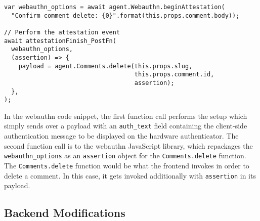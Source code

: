 \begin{lstlisting}
var webauthn_options = await agent.Webauthn.beginAttestation(
  "Confirm comment delete: {0}".format(this.props.comment.body));

// Perform the attestation event
await attestationFinish_PostFn(
  webauthn_options, 
  (assertion) => {
    payload = agent.Comments.delete(this.props.slug, 
                                    this.props.comment.id,
                                    assertion);
  },
);
\end{lstlisting}

In the webauthn code snippet, the first function call performs the setup which simply sends over a payload with an \lstinline{auth_text} field containing the client-side authentication message to be displayed on the hardware authenticator. The second function call is to the webauthn JavaScript library, which repackages the \lstinline{webauthn_options} as an \lstinline{assertion} object for the \lstinline{Comments.delete} function. The \lstinline{Comments.delete} function would be what the frontend invokes in order to delete a comment. In this case, it gets invoked additionally with \lstinline{assertion} in its payload.

\iffalse
initiates a transaction authentication event from the Conduit frontend to delete a comment.

The first POST request performs the setup 

when a user wants to change a website's address.

in order to minimize the impact of this on the frontend.

in order to properly support transaction authentication.

Despite the efforts of the webauthn firewall design to minimize intrusiveness of integrating webauthn into a web-service, 

The frontend of any web-service has to initiate a webauthn transaction authentication event.

The frontend of any service using webauthn transaction authentication has to 

When using a webauthn firewall to integrate transaction authentication into a web-service, the frontend has to include some 
\fi

\subsection{Backend Modifications}

